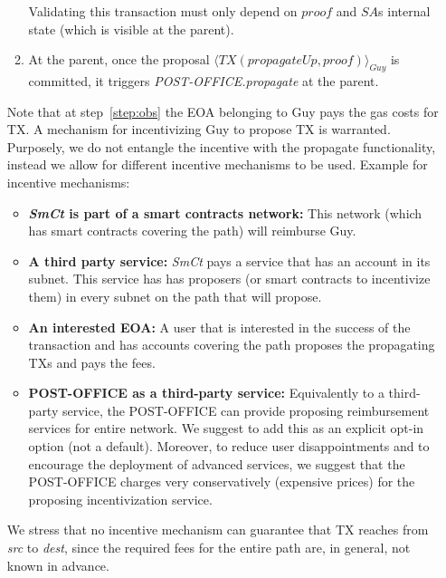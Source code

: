 \begin{itemize}
\begin{enumerate}
        Validating this transaction must only depend on $\textit{proof}$ and $SA$s internal state (which is visible at the parent).
        \item At the parent, once the proposal $\langle TX(\textit{propagateUp}, \textit{proof})\rangle_{Guy}$ is committed, it triggers \textit{POST-OFFICE.propagate} at the parent.
    \end{enumerate}
    Note that at step~\ref{step:obs} the EOA belonging to Guy pays the gas costs for TX.
    A mechanism for incentivizing Guy to propose TX is warranted. Purposely, we do not entangle the incentive with the propagate functionality, instead we allow for different incentive mechanisms to be used.
    Example for incentive mechanisms:
    \begin{itemize}
        \item \textbf{\textit{SmCt} is part of a smart contracts network:} This network (which has smart contracts covering the path) will reimburse Guy.
        \item \textbf{A third party service:} \textit{SmCt} pays a service that has an account in its subnet. This service has has proposers (or smart contracts to incentivize them) in every subnet on the path that will propose.
        \item \textbf{An interested EOA:} A user that is interested in the success of the transaction and has accounts covering the path proposes the propagating TXs and pays the fees.
        \item \textbf{POST-OFFICE as a third-party service:} Equivalently to a third-party service, the POST-OFFICE can provide proposing reimbursement services for entire network. We suggest to add this as an explicit opt-in option (not a default). Moreover, to reduce user disappointments and to encourage the deployment of advanced services, we suggest that the POST-OFFICE charges very conservatively (expensive prices) for the proposing incentivization service.
    \end{itemize}
    We stress that no incentive mechanism can guarantee that TX reaches from \textit{src} to \textit{dest}, since the required fees for the entire path are, in general, not known in advance.


    
      

\end{itemize}
